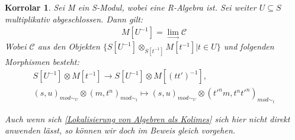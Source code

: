 \documentclass[10pt,a4paper]{report}
\newcommand{\comment}[1]{}
\newcounter{Aussage}[chapter]
\newtheorem{korrolar}[Aussage]{Korrolar}
\newcommand{\Tensor}[3]{#1 \otimes_{#2} #3}
\newcommand{\tensor}[3]{#1 \otimes #3}
\newcommand{\lok}[2]{#1 [#2^{-1}]}
\newcommand{\loke}[3]{(#1,#2)_{mod\sim_{#3}}}
\newcommand{\colimes}[0]{\lim\limits_{ \longrightarrow }}
\begin{document}
\begin{korrolar}\comment{\label{Lokalisierung von Moduln als Kolimes}}
Sei M ein S-Modul, wobei eine R-Algebra ist. Sei weiter $U \subseteq S$ multiplikativ abgeschlossen. Dann gilt:
\begin{gather*}
\lok{M}{U} = \colimes \mathcal{C}
\end{gather*}
Wobei $\mathcal{C}$ aus den Objekten $\lbrace \Tensor{\lok{S}{U}}{\lok{S}{t}}{\lok{M}{t}} \vert t \in U \rbrace$ und folgenden Morphismen besteht:
\begin{gather*}
\tensor{\lok{S}{U}}{\lok{S}{t}}{\lok{M}{t}} \longrightarrow
\tensor{\lok{S}{U}}{\lok{S}{(tt')}}{\lok{M}{(tt')}} ,\\
\tensor{\loke{s}{u}{U}}{\lok{S}{t}}{\loke{m}{t^n}{t}} \longmapsto
\tensor{\loke{s}{u}{U}}{\lok{S}{t}}{\loke{t'^nm}{t^nt'^n}{t}} 
\end{gather*}
\end{korrolar}
\textit{Auch wenn sich \cref{Lokalisierung von Algebren als Kolimes} sich hier nicht direkt anwenden lässt, so können wir doch im Beweis gleich vorgehen.}
\end{document}
